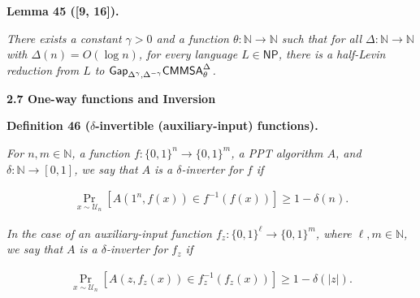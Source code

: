 



\par\medskip\noindent\textbf{
\textbf{Lemma 45}\textbf{ }([9, 16])\textbf{.}
}\par



\emph{There exists a constant $\gamma>0$ and a function $\theta:\mathbb{N}\to\mathbb{N}$ such that for all $\Delta:\mathbb{N}\to\mathbb{N}$ with $\Delta(n)=O(\log n)$, for every language $L\in{\mathsf{NP}}$, there is a half-Levin reduction from $L$ to ${\sf Gap}_{\Delta^{\gamma},\Delta^{-\gamma}}{\mathsf{CMMSA}}^{\Delta}_{\theta}$.}\par







\par\medskip\noindent\textbf{
2.7 One-way functions and Inversion}\par





\par\medskip\noindent\textbf{
\textbf{Definition 46}\textbf{ }($\delta$-invertible (auxiliary-input) functions)\textbf{.}
}\par



\emph{For $n,m\in\mathbb{N}$, a function $f:\{0,1\}^{n}\to\{0,1\}^{m}$, a PPT algorithm $A$, and $\delta:\mathbb{N}\to[0,1]$, we say that $A$ is a $\delta$-inverter for $f$ if}\par


\[\begin{gathered}
\Pr_{x\sim\mathcal{U}_{n}}[A(1^{n},f(x))\in f^{-1}(f(x))]\geq 1-\delta(n).
\end{gathered}\]




\emph{In the case of an auxiliary-input function $f_{z}:\{0,1\}^{\ell}\to\{0,1\}^{m}$, where $\ell,m\in\mathbb{N}$, we say that $A$ is a $\delta$-inverter for $f_{z}$ if}\par


\[\begin{gathered}
\Pr_{x\sim\mathcal{U}_{n}}[A(z,f_{z}(x))\in f_{z}^{-1}(f_{z}(x))]\geq 1-\delta(|z|).
\end{gathered}\]



